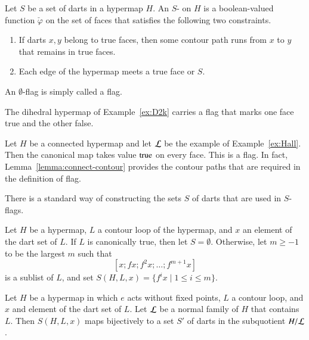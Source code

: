 \begin{definition}[flag]\label{def:flag} 
  Let $S$ be a set of darts in a hypermap $H$.  An $S$-
  on $H$ is a boolean-valued function $\check\varphi$ on the set of faces that
  satisfies the following two constraints.
\begin{enumerate}
\item If darts $x,y$ belong to true faces,
then  some contour path runs from $x$ to $y$ that remains
in true faces.
\item Each edge of the hypermap meets a true face or $S$.
\end{enumerate}
An $\emptyset$-flag is simply called a flag.
%
%
\end{definition}



\begin{example} \label{ex:DH}
The dihedral hypermap of Example~\ref{ex:D2k} carries a
flag that marks one face true and the other false.
\end{example}

\begin{example}\label{ex:Hall-flag} 
Let $H$ be a connected hypermap and let $\cal L$ be the example of
Example~\ref{ex:Hall}. Then the canonical map takes value
${\operatorname{true}}$ on every face.  This is a flag. In fact,
Lemma~\ref{lemma:connect-contour} provides the contour paths that
are required in the definition of flag.
\end{example}



There is a standard way of constructing the sets $S$ of darts that
 are used in $S$-flags.  


\begin{definition}[S]
Let $H$ be a hypermap, $L$ a contour loop of the hypermap,
and $x$ an element of the dart set of $L$.
If  $L$ is  canonically true, then let $S=\emptyset$.
Otherwise,
let $m\ge-1$ to be the largest $m$ 
such that 
\[ 
[x;f x; f^2 x;\ldots;f^{m+1} x]
\]   
is a sublist of $L$, and
set $S(H,L,x) = \{f^i x \mid 1 \le i\le m\}$.
\end{definition}
%

\begin{lemma}\label{lemma:flag-set-subquotient}
Let $H$ be a hypermap in which $e$ acts without fixed points, 
$L$ a contour loop, and $x$ and element of the dart set of $L$.
Let ${\cal L}$ be a normal family of $H$ that contains $L$.
Then $S(H,L,x)$ maps bijectively to a set $S'$ of darts in the subquotient $H/{\cal L}$.
\end{lemma}

